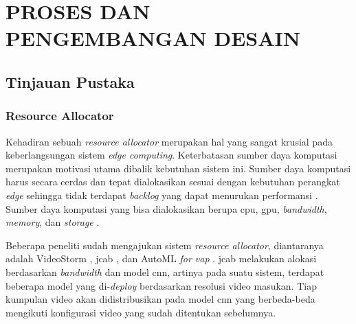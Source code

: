 \chapter{PROSES DAN PENGEMBANGAN DESAIN}



\section{Tinjauan Pustaka}

    \subsection{Resource Allocator}
    Kehadiran sebuah \textit{resource allocator} merupakan hal yang sangat krusial pada keberlangsungan sistem \textit{edge computing}. Keterbatasan sumber daya komputasi merupakan motivasi
    utama dibalik kebutuhan sistem ini. Sumber daya komputasi harus secara cerdas dan tepat dialokasikan sesuai dengan kebutuhan perangkat \textit{edge} 
    sehingga tidak terdapat \textit{backlog} yang dapat menurukan performansi \citep{edgeComp2}.
    Sumber daya komputasi yang bisa dialokasikan berupa \gls{cpu}, \gls{gpu}, \textit{bandwidth}, \textit{memory}, dan \textit{storage} \citep{edgeCompDis}.

    Beberapa peneliti sudah mengajukan sistem \textit{resource allocator}, diantaranya adalah VideoStorm \citep{videostorm}, \gls{jcab} \citep{jcab}, dan AutoML \textit{for \gls{vap}} \citep{automl}.
    \gls{jcab} melakukan alokasi berdasarkan \textit{bandwidth} dan model \gls{cnn}, artinya pada suatu sistem, terdapat beberapa model yang di-\textit{deploy} berdasarkan resolusi video masukan. 
    Tiap kumpulan video akan didistribusikan pada model \gls{cnn} yang berbeda-beda mengikuti konfigurasi video yang sudah ditentukan sebelumnya.

